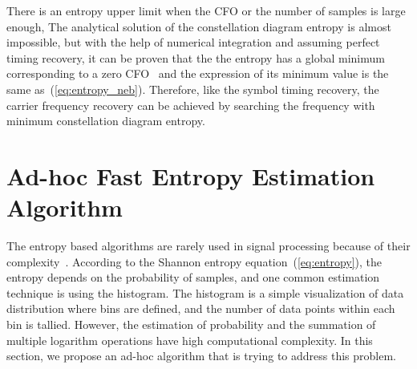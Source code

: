 \documentclass[journal,comsoc]{IEEEtran}
\begin{document}
There is an entropy upper limit when the CFO or the number of samples is large enough,
The analytical solution of the constellation diagram entropy is almost impossible,
but with the help of  numerical integration and assuming perfect timing recovery, it can be proven that the the entropy has a global minimum corresponding to a zero CFO~\cite{Pedzisz2006} and the expression of its minimum value is the same as~(\ref{eq:entropy_neb}).
Therefore, like the symbol timing recovery, the carrier frequency recovery can be achieved by searching the frequency with minimum constellation diagram entropy.


\section{Ad-hoc Fast Entropy Estimation Algorithm}
\label{sec:adhoc}
The entropy based algorithms are rarely used in signal processing because of their complexity~\cite{Bercher2000}.
According to the Shannon entropy equation~(\ref{eq:entropy}), the entropy depends on the probability of samples, and one common estimation technique is using the histogram.
The histogram is a simple visualization of data distribution where bins are defined, and the number of data points within each bin is tallied. 
However, the estimation of probability and the summation of multiple logarithm operations have high computational complexity.
In this section, we propose an ad-hoc algorithm that is trying to address this problem. 
\end{document}
